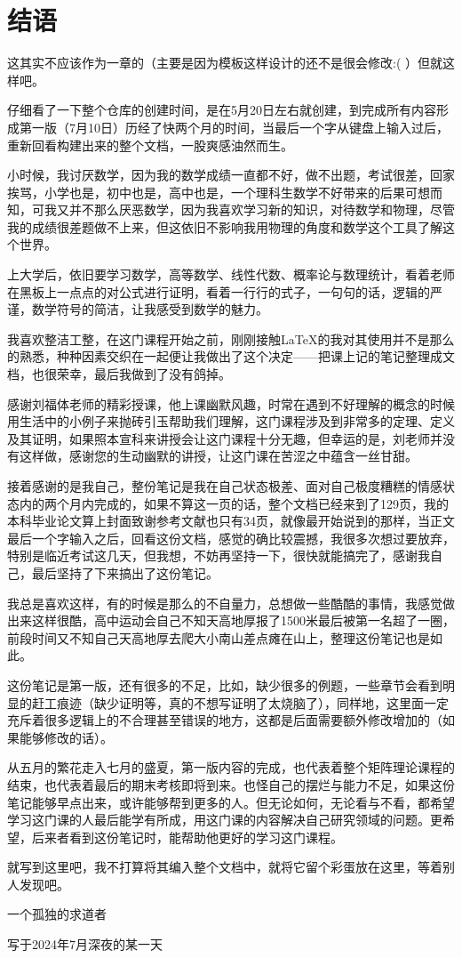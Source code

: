 \documentclass[12pt, a4paper, oneside, UTF8]{ctexbook}
\begin{document}
\else
\fi
\chapter{结语}
这其实不应该作为一章的（主要是因为模板这样设计的还不是很会修改:( ）但就这样吧。

仔细看了一下整个仓库的创建时间，是在5月20日左右就创建，到完成所有内容形成第一版（7月10日）历经了快两个月的时间，当最后一个字从键盘上输入过后，重新回看构建出来的整个文档，一股爽感油然而生。

小时候，我讨厌数学，因为我的数学成绩一直都不好，做不出题，考试很差，回家挨骂，小学也是，初中也是，高中也是，一个理科生数学不好带来的后果可想而知，可我又并不那么厌恶数学，因为我喜欢学习新的知识，对待数学和物理，尽管我的成绩很差题做不上来，但这依旧不影响我用物理的角度和数学这个工具了解这个世界。

上大学后，依旧要学习数学，高等数学、线性代数、概率论与数理统计，看着老师在黑板上一点点的对公式进行证明，看着一行行的式子，一句句的话，逻辑的严谨，数学符号的简洁，让我感受到数学的魅力。

我喜欢整洁工整，在这门课程开始之前，刚刚接触\LaTeX 的我对其使用并不是那么的熟悉，种种因素交织在一起便让我做出了这个决定——把课上记的笔记整理成文档，也很荣幸，最后我做到了没有鸽掉。

感谢刘福体老师的精彩授课，他上课幽默风趣，时常在遇到不好理解的概念的时候用生活中的小例子来抛砖引玉帮助我们理解，这门课程涉及到非常多的定理、定义及其证明，如果照本宣科来讲授会让这门课程十分无趣，但幸运的是，刘老师并没有这样做，感谢您的生动幽默的讲授，让这门课在苦涩之中蕴含一丝甘甜。

接着感谢的是我自己，整份笔记是我在自己状态极差、面对自己极度糟糕的情感状态内的两个月内完成的，如果不算这一页的话，整个文档已经来到了129页，我的本科毕业论文算上封面致谢参考文献也只有34页，就像最开始说到的那样，当正文最后一个字输入之后，回看这份文档，感觉的确比较震撼，我很多次想过要放弃，特别是临近考试这几天，但我想，不妨再坚持一下，很快就能搞完了，感谢我自己，最后坚持了下来搞出了这份笔记。

我总是喜欢这样，有的时候是那么的不自量力，总想做一些酷酷的事情，我感觉做出来这样很酷，高中运动会自己不知天高地厚报了1500米最后被第一名超了一圈，前段时间又不知自己天高地厚去爬大小南山差点瘫在山上，整理这份笔记也是如此。

这份笔记是第一版，还有很多的不足，比如，缺少很多的例题，一些章节会看到明显的赶工痕迹（缺少证明等，真的不想写证明了太烧脑了），同样地，这里面一定充斥着很多逻辑上的不合理甚至错误的地方，这都是后面需要额外修改增加的（如果能够修改的话）。

从五月的繁花走入七月的盛夏，第一版内容的完成，也代表着整个矩阵理论课程的结束，也代表着最后的期末考核即将到来。也怪自己的摆烂与能力不足，如果这份笔记能够早点出来，或许能够帮到更多的人。但无论如何，无论看与不看，都希望学习这门课的人最后能学有所成，用这门课的内容解决自己研究领域的问题。更希望，后来者看到这份笔记时，能帮助他更好的学习这门课程。

就写到这里吧，我不打算将其编入整个文档中，就将它留个彩蛋放在这里，等着别人发现吧。


{\hfill 一个孤独的求道者}

{\hfill 写于2024年7月深夜的某一天}

\ifx\allfiles\undefined
\end{document}
